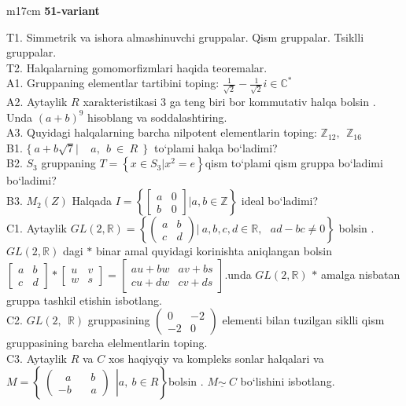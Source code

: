 \documentclass{article}
\begin{document}
\begin{tabular}{m{17cm}}
\textbf{51-variant}
\newline

T1. Simmetrik va ishora almashinuvchi gruppalar. Qism gruppalar. Tsiklli gruppalar. \\
T2. Halqalarning gomomorfizmlari haqida teoremalar. \\
A1. Gruppaning elementlar tartibini toping: \(\frac{1}{\sqrt{2}} - \frac{1}{\sqrt{2}}i \in \mathbb{C}^{*}\) \\
A2. Aytaylik \(R\) xarakteristikasi 3 ga teng biri bor kommutativ halqa bo\textquotesingle lsin . Unda \((a + b)^{9}\) hisoblang va soddalashtiring. \\
A3. Quyidagi halqalarning barcha nilpotent elementlarin toping: \(\mathbb{Z}_{12},\ \ \mathbb{Z}_{16}\) \\
B1. \(\{\ a + b\sqrt{7}\left| \ \ \ \ \ a,\ \ b\  \in \ R\ \ \} \right.\ \) to`plami halqa bo`ladimi? \\
B2. \(S_{3}\) gruppaning \(T = \left\{ x \in S_{3}|x^{2} = e \right\}\)qism to`plami qism gruppa bo`ladimi bo`ladimi? \\
B3. \(M_{2}(Z)\) Halqada \(I = \left\{ \begin{bmatrix}
a & 0 \\
b & 0
\end{bmatrix}|a,b\mathbb{\in Z} \right\}\) ideal bo`ladimi? \\
C1. Aytaylik \(GL(2,\mathbb{R}) = \left\{ \begin{pmatrix}
a & b \\
c & d
\end{pmatrix}|\ a,b,c,d\mathbb{\in R},\ \ \ ad - bc \neq 0 \right\}\) bo\textquotesingle lsin . \(GL(2,\mathbb{R})\) dagi \(*\) binar amal quyidagi ko\textquotesingle rinishta aniqlangan bo\textquotesingle lsin \(\begin{bmatrix}
a & b \\
c & d
\end{bmatrix}*\begin{bmatrix}
u & v \\
w & s
\end{bmatrix} = \begin{bmatrix}
au + bw & av + bs \\
cu + dw & cv + ds
\end{bmatrix}\).unda \(GL(2,\mathbb{R})\) \(*\) amalga nisbatan gruppa tashkil etishin isbotlang. \\
C2. \(GL(2,\mathbb{\ \ R})\) gruppasining \(\begin{pmatrix}
0 & - 2 \\
 - 2 & 0
\end{pmatrix}\) elementi bilan tuzilgan siklli qism gruppasining barcha elelmentlarin toping. \\
C3. Aytaylik \(R\) va \(C\) xos haqiyqiy va kompleks sonlar halqalari va\(M = \left\{ \left. \ \begin{pmatrix}
\ \ \ a\ \ \ \ \ \ \ \ b \\
 - b\ \ \ \ \ \ \ \ a
\end{pmatrix}\ \  \right|a,\ b \in R \right\}\)bo\textquotesingle lsin . \(M\underline{\sim}\ C\) bo`lishini isbotlang. \\


\end{tabular}
\end{document}
